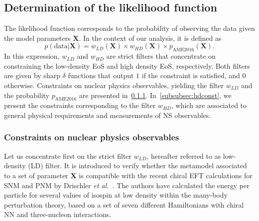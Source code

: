 \subsection{Determination of the likelihood function}\label{subsec:likeli}

The likelihood function corresponds to the probability of observing the data
given the model parameters $\bm{X}$. In the context of our analysis, it is
defined as
%
\begin{equation}
  p(\text{data}|\bm{X}) = w_{LD}(\bm{X}) \times 
  w_{HD}(\bm{X}) \times p_{\text{AME2016}}(\bm{X}).\label{eq:likelihood}
\end{equation}
%
In this expression, $w_{LD}$ and $w_{HD}$ are strict filters that concentrate
on constraining the low-density EoS and high density EoS, respectively. Both 
filters are given by sharp $\delta$ functions that output $1$ if the constraint 
is satisfied, and $0$ otherwise. 
Constraints on nuclear physics observables, yielding the filter $w_{LD}$ and 
the probability $p_{\text{AME2016}}$ are presented in~\ref{subsubsec:ldconst}.
In~\ref{subsubsec:hdconst}, we present the
constraints corresponding to the filter $w_{HD}$, which are associated to 
general physical requirements and measurements of NS observables. 

\subsubsection{Constraints on nuclear physics
observables}\label{subsubsec:ldconst}

Let us concentrate first on the strict filter $w_{LD}$, hereafter referred to 
as low-density (LD) filter. It is introduced to verify whether the metamodel 
associated to a set of parameter $\bm{X}$ is compatible with the recent chiral
EFT calculations for SNM and PNM by Drischler 
\textit{et al.}~\cite{Drischler2016}. The authors have calculated the energy
per particle for several values of isospin at low density within the many-body
perturbation theory, based on a set of seven different Hamiltonians with chiral 
NN and three-nucleon interactions.


